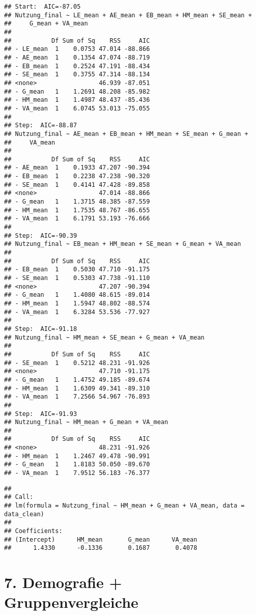 \documentclass[
]{article}
\begin{document}
\begin{verbatim}
## Start:  AIC=-87.05
## Nutzung_final ~ LE_mean + AE_mean + EB_mean + HM_mean + SE_mean + 
##     G_mean + VA_mean
## 
##           Df Sum of Sq    RSS     AIC
## - LE_mean  1    0.0753 47.014 -88.866
## - AE_mean  1    0.1354 47.074 -88.719
## - EB_mean  1    0.2524 47.191 -88.434
## - SE_mean  1    0.3755 47.314 -88.134
## <none>                 46.939 -87.051
## - G_mean   1    1.2691 48.208 -85.982
## - HM_mean  1    1.4987 48.437 -85.436
## - VA_mean  1    6.0745 53.013 -75.055
## 
## Step:  AIC=-88.87
## Nutzung_final ~ AE_mean + EB_mean + HM_mean + SE_mean + G_mean + 
##     VA_mean
## 
##           Df Sum of Sq    RSS     AIC
## - AE_mean  1    0.1933 47.207 -90.394
## - EB_mean  1    0.2238 47.238 -90.320
## - SE_mean  1    0.4141 47.428 -89.858
## <none>                 47.014 -88.866
## - G_mean   1    1.3715 48.385 -87.559
## - HM_mean  1    1.7535 48.767 -86.655
## - VA_mean  1    6.1791 53.193 -76.666
## 
## Step:  AIC=-90.39
## Nutzung_final ~ EB_mean + HM_mean + SE_mean + G_mean + VA_mean
## 
##           Df Sum of Sq    RSS     AIC
## - EB_mean  1    0.5030 47.710 -91.175
## - SE_mean  1    0.5303 47.738 -91.110
## <none>                 47.207 -90.394
## - G_mean   1    1.4080 48.615 -89.014
## - HM_mean  1    1.5947 48.802 -88.574
## - VA_mean  1    6.3284 53.536 -77.927
## 
## Step:  AIC=-91.18
## Nutzung_final ~ HM_mean + SE_mean + G_mean + VA_mean
## 
##           Df Sum of Sq    RSS     AIC
## - SE_mean  1    0.5212 48.231 -91.926
## <none>                 47.710 -91.175
## - G_mean   1    1.4752 49.185 -89.674
## - HM_mean  1    1.6309 49.341 -89.310
## - VA_mean  1    7.2566 54.967 -76.893
## 
## Step:  AIC=-91.93
## Nutzung_final ~ HM_mean + G_mean + VA_mean
## 
##           Df Sum of Sq    RSS     AIC
## <none>                 48.231 -91.926
## - HM_mean  1    1.2467 49.478 -90.991
## - G_mean   1    1.8183 50.050 -89.670
## - VA_mean  1    7.9512 56.183 -76.377
\end{verbatim}

\begin{verbatim}
## 
## Call:
## lm(formula = Nutzung_final ~ HM_mean + G_mean + VA_mean, data = data_clean)
## 
## Coefficients:
## (Intercept)      HM_mean       G_mean      VA_mean  
##      1.4330      -0.1336       0.1687       0.4078
\end{verbatim}

\section{7. Demografie +
Gruppenvergleiche}\label{demografie-gruppenvergleiche}
\end{document}

